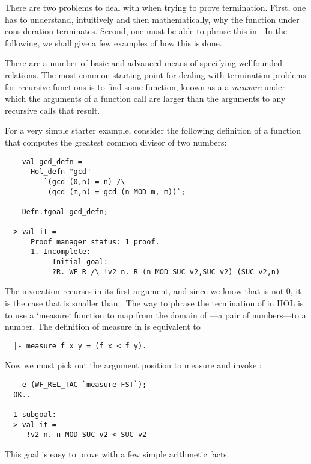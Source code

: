 There are two problems to deal with when trying to prove termination.
First, one has to understand, intuitively and then mathematically,
why the function under consideration terminates. Second, one must
be able to phrase this in \HOL. In the following, we shall give a few
examples of how this is done.

There are a number of basic and advanced means of specifying wellfounded
relations. The most common starting point for dealing with termination
problems for recursive functions is to find some function, known as a a
\emph{measure} under which the arguments of a function call are larger 
than the arguments to any recursive calls that result.

For a very simple starter example, consider the following definition
of a function that computes the greatest common divisor of two
numbers:
%
\setcounter{sessioncount}{0}
\begin{session}
\begin{hol}
\begin{verbatim}
  - val gcd_defn = 
      Hol_defn "gcd"
         `(gcd (0,n) = n) /\
          (gcd (m,n) = gcd (n MOD m, m))`;
 
  - Defn.tgoal gcd_defn;
 
  > val it =
      Proof manager status: 1 proof.
      1. Incomplete:
           Initial goal:
           ?R. WF R /\ !v2 n. R (n MOD SUC v2,SUC v2) (SUC v2,n)
\end{verbatim}
\end{hol}
\end{session}
% 
The invocation  recurses in its first argument, and 
since we know that  is not 0, it is the case that
 is smaller than \holtxt{m}. The way to phrase the 
termination of  in HOL is to use a `measure` function 
to map from the domain of \holtxt{gcd}---a pair of numbers---to a number.  
The definition of {measure} in \HOL{} is equivalent to
%
\begin{hol}
\begin{verbatim}
  |- measure f x y = (f x < f y).
\end{verbatim}
\end{hol}
%
Now we must pick out the argument position to measure and
invoke :
\begin{session}
\begin{hol}
\begin{verbatim}
  - e (WF_REL_TAC `measure FST`);
  OK..
 
  1 subgoal:
  > val it =
     !v2 n. n MOD SUC v2 < SUC v2
\end{verbatim}
\end{hol}
\end{session}
% 
This goal is easy to prove with a few simple arithmetic facts.

